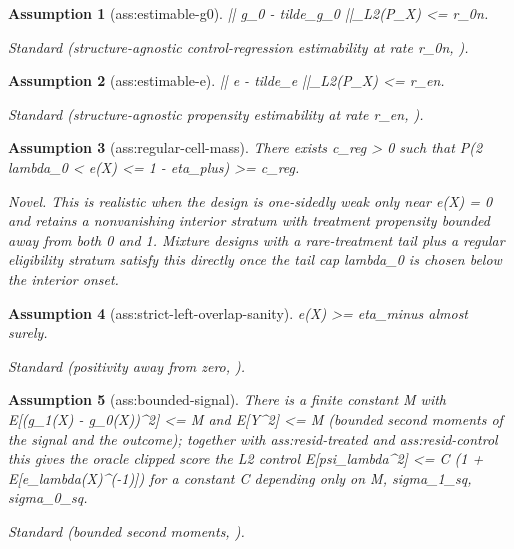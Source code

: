 \documentclass{article}
\newtheorem{assumption}{Assumption}
\begin{document}
\begin{assumption}[ass:estimable-g0]\label{ass:estimable-g0}
|| g_0 - tilde_g_0 ||_{L2(P_X)} <= r_0n.
\par\smallskip\noindent\emph{Standard} (structure-agnostic control-regression estimability at rate r_0n, \cite{JinSyrgkanis2024StructureAgnosticDR}).
\end{assumption}

\begin{assumption}[ass:estimable-e]\label{ass:estimable-e}
|| e - tilde_e ||_{L2(P_X)} <= r_en.
\par\smallskip\noindent\emph{Standard} (structure-agnostic propensity estimability at rate r_en, \cite{BonviniKennedyDukesBalakrishnan2024StructureAgnosticATE}).
\end{assumption}

\begin{assumption}[ass:regular-cell-mass]\label{ass:regular-cell-mass}
There exists c_reg > 0 such that P(2 lambda_0 < e(X) <= 1 - eta_plus) >= c_reg.
\par\smallskip\noindent\emph{Novel.} This is realistic when the design is one-sidedly weak only near e(X) = 0 and retains a nonvanishing interior stratum with treatment propensity bounded away from both 0 and 1. Mixture designs with a rare-treatment tail plus a regular eligibility stratum satisfy this directly once the tail cap lambda_0 is chosen below the interior onset.
\end{assumption}

\begin{assumption}[ass:strict-left-overlap-sanity]\label{ass:strict-left-overlap-sanity}
e(X) >= eta_minus almost surely.
\par\smallskip\noindent\emph{Standard} (positivity away from zero, \cite{HiranoImbensRidder2003EfficientATE}).
\end{assumption}

\begin{assumption}[ass:bounded-signal]\label{ass:bounded-signal}
There is a finite constant M with E[(g_1(X) - g_0(X))^2] <= M and E[Y^2] <= M (bounded second moments of the signal and the outcome); together with ass:resid-treated and ass:resid-control this gives the oracle clipped score the L2 control E[psi_lambda^2] <= C (1 + E[e_lambda(X)^(-1)]) for a constant C depending only on M, sigma_1_sq, sigma_0_sq.
\par\smallskip\noindent\emph{Standard} (bounded second moments, \cite{ChernozhukovEtAl2018DML}).
\end{assumption}
\end{document}
